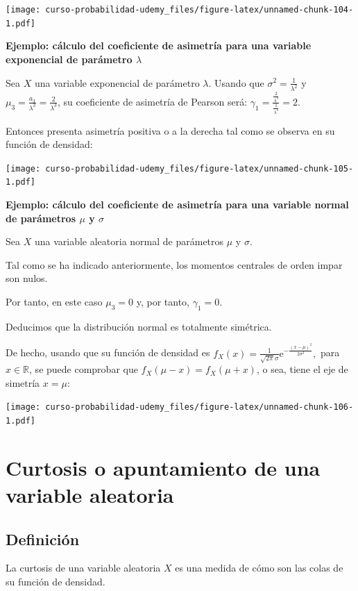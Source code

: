 \documentclass[]{book}
\begin{document}
\texttt{[image: curso-probabilidad-udemy\_files/figure-latex/unnamed-chunk-104-1.pdf]}

\textbf{Ejemplo: cálculo del coeficiente de asimetría para una variable exponencial de parámetro \(\lambda\)}

Sea \(X\) una variable exponencial de parámetro \(\lambda\).
Usando que \(\sigma^2=\frac{1}{\lambda^2}\) y \(\mu_3 =\frac{a_3}{\lambda^3}=\frac{2}{\lambda^3}\), su coeficiente de asimetría de Pearson será:
\(\gamma_1 = \frac{\frac{2}{\lambda^3}}{\frac{1}{\lambda^3}}=2.\)

Entonces presenta asimetría positiva o a la derecha tal como se observa en su función de densidad:

\texttt{[image: curso-probabilidad-udemy\_files/figure-latex/unnamed-chunk-105-1.pdf]}

\textbf{Ejemplo: cálculo del coeficiente de asimetría para una variable normal de parámetros \(\mu\) y \(\sigma\)}

Sea \(X\) una variable aleatoria normal de parámetros \(\mu\) y \(\sigma\).

Tal como se ha indicado anteriormente, los momentos centrales de orden impar son nulos.

Por tanto, en este caso \(\mu_3=0\) y, por tanto, \(\gamma_1=0\).

Deducimos que la distribución normal es totalmente simétrica.

De hecho, usando que su función de densidad es \(f_X(x)=\frac{1}{\sqrt{2\pi}\sigma}\mathrm{e}^{-\frac{(x-\mu)^2}{2\sigma^2}},\) para \(x\in \mathbb{R}\), se puede comprobar que \(f_X(\mu-x)=f_X(\mu +x)\), o sea, tiene el eje de simetría \(x=\mu\):

\texttt{[image: curso-probabilidad-udemy\_files/figure-latex/unnamed-chunk-106-1.pdf]}

\hypertarget{curtosis-o-apuntamiento-de-una-variable-aleatoria}{%
\section{Curtosis o apuntamiento de una variable aleatoria}\label{curtosis-o-apuntamiento-de-una-variable-aleatoria}}

\hypertarget{definiciuxf3n-1}{%
\subsection{Definición}\label{definiciuxf3n-1}}

La curtosis de una variable aleatoria \(X\) es una medida de cómo son las colas de su función de densidad.
\end{document}
